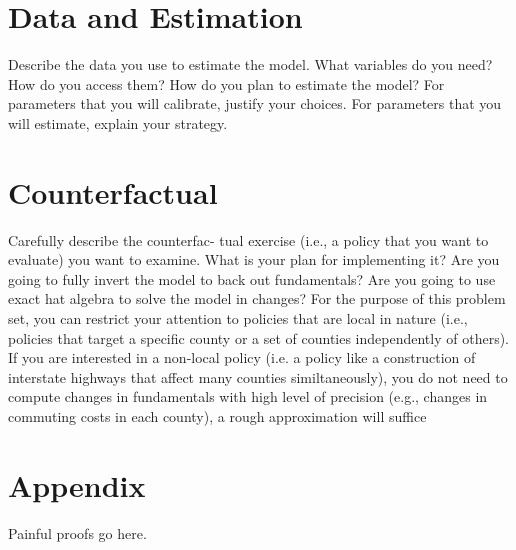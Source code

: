 \documentclass{article}
\begin{document}
\section{Data and Estimation}
\label{sec:data}
Describe the data you use to estimate the model. What
variables do you need? How do you access them? How do you plan to estimate the
model? For parameters that you will calibrate, justify your choices. For parameters
that you will estimate, explain your strategy.

\section{Counterfactual}
\label{sec:counterfactual}
Carefully describe the counterfac-
tual exercise (i.e., a policy that you want to evaluate) you want to examine. What is your plan for implementing it? Are you going to fully invert the model to back out
fundamentals? Are you going to use exact hat algebra to solve the model in changes?
For the purpose of this problem set, you can restrict your attention to policies that
are local in nature (i.e., policies that target a specific county or a set of counties
independently of others). If you are interested in a non-local policy (i.e. a policy like a
construction of interstate highways that affect many counties similtaneously), you do
not need to compute changes in fundamentals with high level of precision (e.g., changes
in commuting costs in each county), a rough approximation will suffice

\section{Appendix}
Painful proofs go here.
\end{document}
